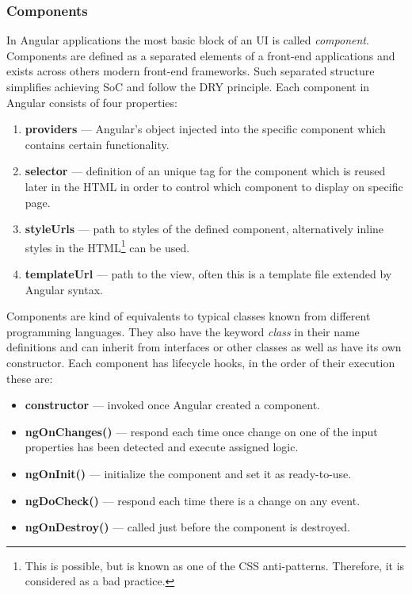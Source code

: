 \documentclass{article} %
\begin{document}
\subsubsection{Components}
In Angular applications the most basic block of an UI is called \textit{component}. Components are defined as a separated elements of a front-end applications and exists across others modern front-end frameworks. Such separated structure simplifies achieving SoC and follow the DRY principle. Each component in Angular consists of four properties:
\begin{enumerate}
    \item \textbf{providers} --- Angular's object injected into the specific component which contains certain functionality.
    \item \textbf{selector} --- definition of an unique tag for the component which is reused later in the HTML in order to control which component to display on specific page.
    \item \textbf{styleUrls} --- path to styles of the defined component, alternatively inline styles in the HTML\footnote{This is possible, but is known as one of the CSS anti-patterns. Therefore, it is considered as a bad practice.} can be used.
    \item \textbf{templateUrl} --- path to the view, often this is a template file extended by Angular syntax.
\end{enumerate}
Components are kind of equivalents to typical classes known from different programming languages. They also have the keyword \textit{class} in their name definitions and can inherit from interfaces or other classes as well as have its own constructor. Each component has lifecycle hooks, in the order of their execution these are:
\begin{itemize}
    \item \textbf{constructor} --- invoked once Angular created a component.
    \item \textbf{ngOnChanges()} --- respond each time once change on one of the input properties has been detected and execute assigned logic.
    \item \textbf{ngOnInit()} --- initialize the component and set it as ready-to-use.
    \item \textbf{ngDoCheck()} --- respond each time there is a change on any event.
    \item \textbf{ngOnDestroy()} --- called just before the component is destroyed.
\end{itemize}
\end{document}

